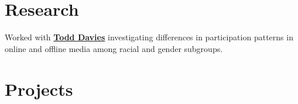 \documentclass[letterpaper]{deedy-resume} %
\begin{document}
\begin{minipage}[t]{0.66\textwidth}
\section{Research}


\begin{tightitemize}
\item Worked with \textbf{\href{http://www.web.stanford.edu/~davies/}{Todd Davies}} investigating differences in participation patterns in online and offline media among racial and gender subgroups.
\end{tightitemize}








\section{Projects}


\end{minipage}
\end{document}
